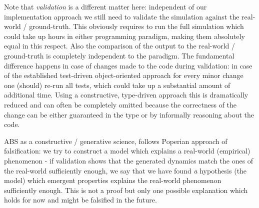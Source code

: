 Note that \textit{validation} is a different matter here: independent of our implementation approach we still need to validate the simulation against the real-world / ground-truth. This obviously requires to run the full simulation which could take up hours in either programming paradigm, making them absolutely equal in this respect. Also the comparison of the output to the real-world / ground-truth is completely independent to the paradigm. The fundamental difference happens in case of changes made to the code during validation: in case of the established test-driven object-oriented approach for every minor change one (should) re-run all tests, which could take up a substantial amount of additional time. Using a constructive, type-driven approach this is dramatically reduced and can often be completely omitted because the correctness of the change can be either guaranteed in the type or by informally reasoning about the code.

ABS as a constructive / generative science, follows Poperian approach of falsification: we try to construct a model which explains a real-world (empirical) phenomenon - if validation shows that the generated dynamics match the ones of the real-world sufficiently enough, we say that we have found \textit{a} hypothesis (the model) which emergent properties explains the real-world phenomenon sufficiently enough. This is not a proof but only one possible explanation which holds for now and might be falsified in the future.

